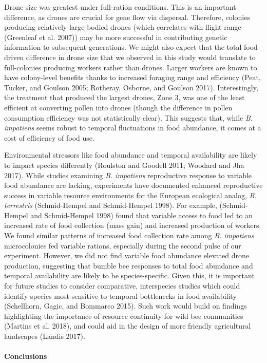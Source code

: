 \documentclass[11pt,]{article}
\let\oldparagraph\paragraph
\renewcommand{\paragraph}[1]{\oldparagraph{#1}\mbox{}}
\begin{document}
Drone size was greatest under full-ration conditions. This is an
important difference, as drones are crucial for gene flow via dispersal.
Therefore, colonies producing relatively large-bodied drones (which
correlates with flight range (Greenleaf et al. 2007)) may be more
successful in contributing genetic information to subsequent
generations. We might also expect that the total food-driven difference
in drone size that we observed in this study would translate to
full-colonies producing workers rather than drones. Larger workers are
known to have colony-level benefits thanks to increased foraging range
and efficiency (Peat, Tucker, and Goulson 2005; Rotheray, Osborne, and
Goulson 2017). Interestingly, the treatment that produced the largest
drones, Zone 3, was one of the least efficient at converting pollen into
drones (though the difference in pollen consumption efficiency was not
statistically clear). This suggests that, while \emph{B. impatiens}
seems robust to temporal fluctuations in food abundance, it comes at a
cost of efficiency of food use.

Environmental stressors like food abundance and temporal availability
are likely to impact species differently (Roulston and Goodell 2011;
Woodard and Jha 2017). While studies examining \emph{B. impatiens}
reproductive response to variable food abundance are lacking,
experiments have documented enhanced reproductive success in variable
resource environments for the European ecological analog, \emph{B.
terrestris} (Schmid-Hempel and Schmid-Hempel 1998). For example,
(Schmid-Hempel and Schmid-Hempel 1998) found that variable access to
food led to an increased rate of food collection (mass gain) and
increased production of workers. We found similar patterns of increased
food collection rate among \emph{B. impatiens} microcolonies fed
variable rations, especially during the second pulse of our experiment.
However, we did not find variable food abundance elevated drone
production, suggesting that bumble bee responses to total food abundance
and temporal availability are likely to be species-specific. Given this,
it is important for future studies to consider comparative, interspecies
studies which could identify species most sensitive to temporal
bottlenecks in food availability (Schellhorn, Gagic, and Bommarco 2015).
Such work would build on findings highlighting the importance of
resource continuity for wild bee communities (Martins et al. 2018), and
could aid in the design of more friendly agricultural landscapes (Landis
2017).

\hypertarget{conclusions}{%
\paragraph{Conclusions}\label{conclusions}}
\end{document}
